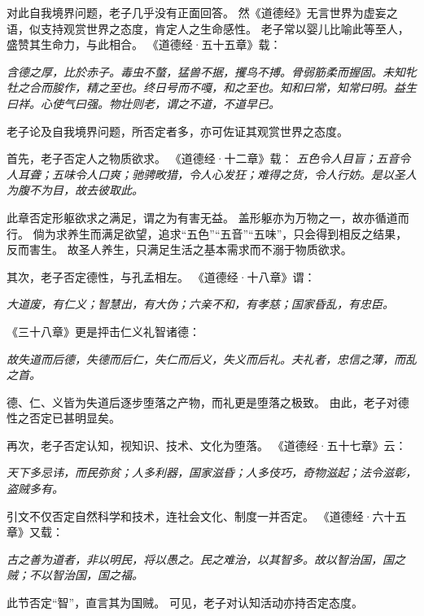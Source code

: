 \documentclass[11pt]{article}
\begin{document}
\newline

对此自我境界问题，老子几乎没有正面回答。
然《道德经》无言世界为虚妄之语，似支持观赏世界之态度，肯定人之生命感性。
老子常以婴儿比喻此等至人，盛赞其生命力，与此相合。
《道德经·五十五章》载：

\textit{含德之厚，比於赤子。毒虫不螫，猛兽不据，攫鸟不搏。骨弱筋柔而握固。未知牝牡之合而朘作，精之至也。终日号而不嘎，和之至也。知和曰常，知常曰明。益生曰祥。心使气曰强。物壮则老，谓之不道，不道早已。}

\newline

老子论及自我境界问题，所否定者多，亦可佐证其观赏世界之态度。

\newline

首先，老子否定人之物质欲求。
《道德经·十二章》载：
\textit{五色令人目盲；五音令人耳聋；五味令人口爽；驰骋畋猎，令人心发狂；难得之货，令人行妨。是以圣人为腹不为目，故去彼取此。}

此章否定形躯欲求之满足，谓之为有害无益。
盖形躯亦为万物之一，故亦循道而行。
倘为求养生而满足欲望，追求“五色”“五音”“五味”，只会得到相反之结果，反而害生。
故圣人养生，只满足生活之基本需求而不溺于物质欲求。

\newline

其次，老子否定德性，与孔孟相左。
《道德经·十八章》谓：

\textit{大道废，有仁义；智慧出，有大伪；六亲不和，有孝慈；国家昏乱，有忠臣。}

《三十八章》更是抨击仁义礼智诸德：

\textit{故失道而后德，失德而后仁，失仁而后义，失义而后礼。夫礼者，忠信之薄，而乱之首。}

德、仁、义皆为失道后逐步堕落之产物，而礼更是堕落之极致。
由此，老子对德性之否定已甚明显矣。

\newline

再次，老子否定认知，视知识、技术、文化为堕落。
《道德经·五十七章》云：

\textit{天下多忌讳，而民弥贫；人多利器，国家滋昏；人多伎巧，奇物滋起；法令滋彰，盗贼多有。}

引文不仅否定自然科学和技术，连社会文化、制度一并否定。
《道德经·六十五章》又载：

\textit{古之善为道者，非以明民，将以愚之。民之难治，以其智多。故以智治国，国之贼；不以智治国，国之福。}

此节否定“智”，直言其为国贼。
可见，老子对认知活动亦持否定态度。
\end{document}
